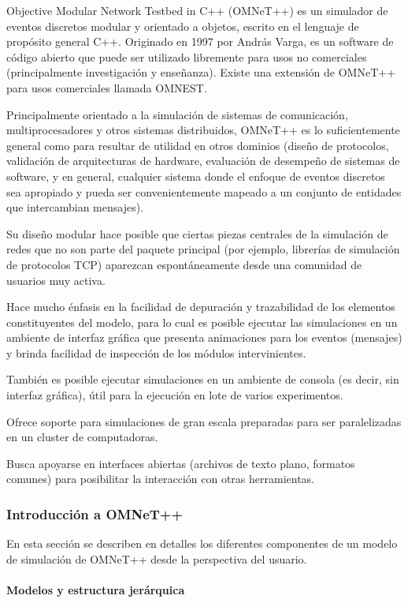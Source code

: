 \documentclass[]{article}
\begin{document}
Objective Modular Network Testbed in C++ (OMNeT++) es un simulador de eventos
discretos modular y orientado a objetos, escrito en el lenguaje de propósito
general C++. Originado en 1997 por András Varga, es un software de código
abierto que puede ser utilizado libremente para usos no comerciales
(principalmente investigación y enseñanza). Existe una extensión de OMNeT++
para usos comerciales llamada OMNEST.

Principalmente orientado a la simulación de sistemas de comunicación,
multiprocesadores y otros sistemas distribuidos, OMNeT++ es lo suficientemente
general como para resultar de utilidad en otros dominios (diseño de protocolos,
validación de arquitecturas de hardware, evaluación de desempeño de sistemas de
software, y en general, cualquier sistema donde el enfoque de eventos discretos
sea apropiado y pueda ser convenientemente mapeado a un conjunto de entidades
que intercambian mensajes).

Su diseño modular hace posible que ciertas piezas centrales de la simulación de
redes que no son parte del paquete principal (por ejemplo, librerías de
simulación de protocolos TCP) aparezcan espontáneamente desde una comunidad de
usuarios muy activa.

Hace mucho énfasis en la facilidad de depuración y trazabilidad de los
elementos constituyentes del modelo, para lo cual es posible ejecutar las
simulaciones en un ambiente de interfaz gráfica que presenta animaciones para
los eventos (mensajes) y brinda facilidad de inspección de los módulos
intervinientes.

También es posible ejecutar simulaciones en un ambiente de consola (es decir,
sin interfaz gráfica), útil para la ejecución en lote de varios experimentos.

Ofrece soporte para simulaciones de gran escala preparadas para ser
paralelizadas en un cluster de computadoras.

Busca apoyarse en interfaces abiertas (archivos de texto plano, formatos
comunes) para posibilitar la interacción con otras herramientas.

\subsubsection{Introducción a OMNeT++}

En esta sección se describen en detalles los diferentes componentes de un
modelo de simulación de OMNeT++ desde la perspectiva del usuario.

\paragraph{Modelos y estructura jerárquica}
\end{document}
